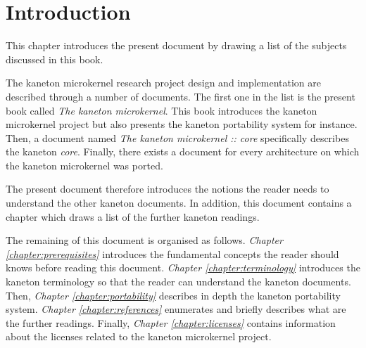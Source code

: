 %
%
%
%
%
%

%
%

\chapter{Introduction}

This chapter introduces the present document by drawing a list of the subjects
discussed in this book.

\newpage

%
%

The kaneton microkernel research project design and implementation are
described through a number of documents. The first one in the list is
the present book called \textit{The kaneton microkernel}. This book introduces
the kaneton microkernel project but also presents the kaneton portability
system for instance. Then, a document named \textit{The kaneton
microkernel :: core} specifically describes the kaneton \textit{core}.
Finally, there exists a document for every architecture on which the kaneton
microkernel was ported.

The present document therefore introduces the notions the reader needs to
understand the other kaneton documents. In addition, this document contains
a chapter which draws a list of the further kaneton readings.

The remaining of this document is organised as follows. \textit{Chapter
\ref{chapter:prerequisites}} introduces the fundamental concepts the reader
should knows before reading this document.  \textit{Chapter
\ref{chapter:terminology}} introduces the kaneton terminology so that the
reader can understand the kaneton documents. Then, \textit{Chapter
\ref{chapter:portability}} describes in depth the kaneton portability
system. \textit{Chapter \ref{chapter:references}} enumerates and briefly
describes what are the further readings. Finally, \textit{Chapter
\ref{chapter:licenses}} contains information about the licenses related
to the kaneton microkernel project.
